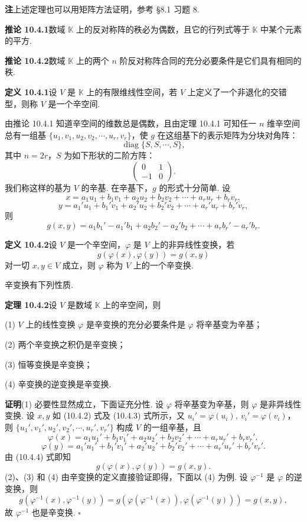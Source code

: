\documentclass[UTF8,12pt,a4paper,fontset=fandol]{ctexart}
\begin{document}
\noindent\textbf{注}\quad 上述定理也可以用矩阵方法证明，参考 §8.1 习题 8.

\noindent\textbf{推论 10.4.1}\quad 数域 $\mathbb K$ 上的反对称阵的秩必为偶数，且它的行列式等于 $\mathbb K$ 中某个元素的平方.

\noindent\textbf{推论 10.4.2}\quad 数域 $\mathbb K$ 上的两个 $n$ 阶反对称阵合同的充分必要条件是它们具有相同的秩.

\noindent\textbf{定义 10.4.1}\quad 设 $V$ 是 $\mathbb K$ 上的有限维线性空间，若 $V$ 上定义了一个非退化的交错型，则称 $V$ 是一个辛空间.

由推论 10.4.1 知道辛空间的维数总是偶数，且由定理 10.4.1 可知任一 $n$ 维辛空间总有一组基 $\{u_1,v_1,u_2,v_2,\cdots,u_r,v_r\}$，使 $g$ 在这组基下的表示矩阵为分块对角阵：
\[
  \operatorname{diag}\{S,S,\cdots,S\},
\]
其中 $n=2r$，$S$ 为如下形状的二阶方阵：
\[
  \left(\begin{array}{cc}
  0&1\\
  -1&0
  \end{array}\right).
\]
我们称这样的基为 $V$ 的辛基. 在辛基下，$g$ 的形式十分简单. 设
\begin{equation}
  x=a_1u_1+b_1v_1+a_2u_2+b_2v_2+\cdots+a_ru_r+b_rv_r,
  \tag{10.4.2}
\end{equation}
\begin{equation}
  y=a_1'u_1+b_1'v_1+a_2'u_2+b_2'v_2+\cdots+a_r'u_r+b_r'v_r,
  \tag{10.4.3}
\end{equation}
则
\begin{equation}
  g(x,y)=a_1b_1'-a_1'b_1+a_2b_2'-a_2'b_2+\cdots+a_rb_r'-a_r'b_r.
  \tag{10.4.4}
\end{equation}

\noindent\textbf{定义 10.4.2}\quad 设 $V$ 是一个辛空间，$\varphi$ 是 $V$ 上的非异线性变换，若
\[
  g(\varphi(x),\varphi(y))=g(x,y)
\]
对一切 $x,y\in V$ 成立，则 $\varphi$ 称为 $V$ 上的一个辛变换.

辛变换有下列性质.

\noindent\textbf{定理 10.4.2}\quad 设 $V$ 是数域 $\mathbb K$ 上的辛空间，则

(1) $V$ 上的线性变换 $\varphi$ 是辛变换的充分必要条件是 $\varphi$ 将辛基变为辛基；

(2) 两个辛变换之积仍是辛变换；

(3) 恒等变换是辛变换；

(4) 辛变换的逆变换是辛变换.

\noindent\textbf{证明}\quad (1) 必要性显然成立，下面证充分性. 设 $\varphi$ 将辛基变为辛基，则 $\varphi$ 是非异线性变换. 设 $x,y$ 如 (10.4.2) 式及 (10.4.3) 式所示，又 $u_i'=\varphi(u_i),\ v_i'=\varphi(v_i)$，则 $\{u_1',v_1',u_2',v_2',\cdots,u_r',v_r'\}$ 构成 $V$ 的一组辛基，且
\[
  \varphi(x)=a_1u_1'+b_1v_1'+a_2u_2'+b_2v_2'+\cdots+a_ru_r'+b_rv_r',
\]
\[
  \varphi(y)=a_1'u_1'+b_1'v_1'+a_2'u_2'+b_2'v_2'+\cdots+a_r'u_r'+b_r'v_r'.
\]
由 (10.4.4) 式即知
\[
  g(\varphi(x),\varphi(y))=g(x,y).
\]
(2)、(3) 和 (4) 由辛变换的定义直接验证即得，下面以 (4) 为例. 设 $\varphi^{-1}$ 是 $\varphi$ 的逆变换，则
\[
  g(\varphi^{-1}(x),\varphi^{-1}(y))
  =g(\varphi(\varphi^{-1}(x)),\varphi(\varphi^{-1}(y)))=g(x,y),
\]
故 $\varphi^{-1}$ 也是辛变换. $\square$
\end{document}
